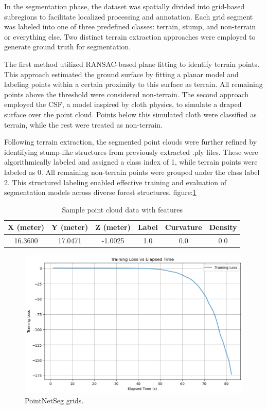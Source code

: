 \documentclass[../report.tex]{subfiles}
\begin{document}
In the segmentation phase, the dataset was spatially divided into grid-based subregions to facilitate localized processing and annotation. Each grid segment was labeled into one of three predefined classes: terrain, stump, and non-terrain or everything else. Two distinct terrain extraction approaches were employed to generate ground truth for segmentation.

The first method utilized RANSAC-based plane fitting to identify terrain points. This approach estimated the ground surface by fitting a planar model and labeling points within a certain proximity to this surface as terrain. All remaining points above the threshold were considered non-terrain. The second approach employed the CSF, a model inspired by cloth physics, to simulate a draped surface over the point cloud. Points below this simulated cloth were classified as terrain, while the rest were treated as non-terrain.

Following terrain extraction, the segmented point clouds were further refined by identifying stump-like structures from previously extracted .ply files. These were algorithmically labeled and assigned a class index of 1, while terrain points were labeled as 0\cite{Pytorch_Pointnet_Pointnet2}. All remaining non-terrain points were grouped under the class label 2. This structured labeling enabled effective training and evaluation of segmentation models across diverse forest structures. figure:\ref{fig:pointnetseg_grids}

\begin{table}[h!]
\centering

\begin{tabular}{cccccc}
\toprule
X (meter) & Y (meter) & Z (meter) & Label & Curvature & Density \\
\midrule
16.3600 & 17.0471 & -1.0025 & 1.0 & 0.0 & 0.0 \\
\bottomrule
\end{tabular}
\caption{Sample point cloud data with features}
\label{tab:datasample}
\end{table}

\begin{figure}
    \centering
    \includegraphics[width=0.9\linewidth]{rnd-project-report-main/figures/PointNetSeg_grids.png}
    \caption{PointNetSeg grids.}
    \label{fig:pointnetseg_grids}
\end{figure}
\end{document}
